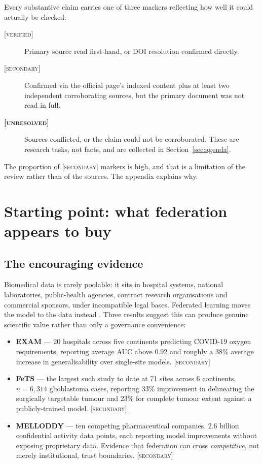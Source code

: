 \documentclass[11pt,a4paper]{article}
\newcommand{\flag}[1]{\textcolor{flagcolor}{\textbf{#1}}}
\newcommand{\verified}{\textsc{[verified]}}
\newcommand{\secondary}{\textsc{[secondary]}}
\newcommand{\unresolved}{\flag{\textsc{[unresolved]}}}
\begin{document}
Every substantive claim carries one of three markers reflecting how well it
could actually be checked:

\begin{description}
  \item[\verified] Primary source read first-hand, or DOI resolution
  confirmed directly.
  \item[\secondary] Confirmed via the official page's indexed content plus
  at least two independent corroborating sources, but the primary document
  was not read in full.
  \item[\unresolved] Sources conflicted, or the claim could not be
  corroborated. These are research tasks, not facts, and are collected in
  Section~\ref{sec:agenda}.
\end{description}

The proportion of \secondary{} markers is high, and that is a limitation of
the review rather than of the sources. The appendix explains why.

\section{Starting point: what federation appears to buy}

\subsection{The encouraging evidence}

Biomedical data is rarely poolable: it sits in hospital systems, national
laboratories, public-health agencies, contract research organisations and
commercial sponsors, under incompatible legal bases. Federated learning
moves the model to the data instead \citep{rieke2020future,
kairouz2021advances, sheller2020federated}. Three results suggest this can
produce genuine scientific value rather than only a governance convenience:

\begin{itemize}
  \item \textbf{EXAM} \citep{dayan2021federated} --- 20 hospitals across
  five continents predicting COVID-19 oxygen requirements, reporting average
  AUC above 0.92 and roughly a 38\% average increase in generalisability
  over single-site models. \secondary

  \item \textbf{FeTS} \citep{pati2022federated, pati2023correction} --- the
  largest such study to date at 71 sites across 6 continents, $n = 6{,}314$
  glioblastoma cases, reporting 33\% improvement in delineating the
  surgically targetable tumour and 23\% for complete tumour extent against a
  publicly-trained model. \secondary

  \item \textbf{MELLODDY} \citep{heyndrickx2024melloddy} --- ten competing
  pharmaceutical companies, 2.6 billion confidential activity data points,
  each reporting model improvements without exposing proprietary data.
  Evidence that federation can cross \emph{competitive}, not merely
  institutional, trust boundaries. \secondary
\end{itemize}
\end{document}
